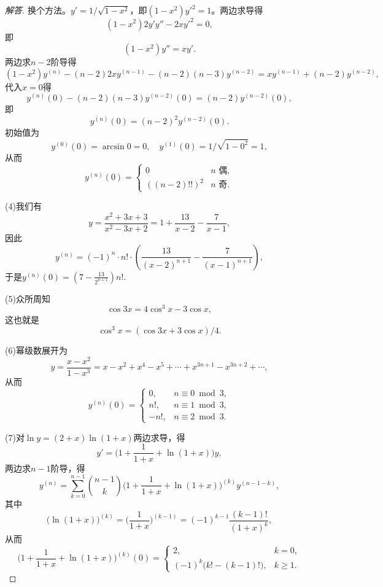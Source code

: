 \begin{3a}
\begin{enumerate}
\begin{proof}[解答]
换个方法。\(y'=1\big/\sqrt{1-x^2}\)，即\((1-x^2)y'^2=1\)。两边求导得
\[(1-x^2)2y'y''-2xy'^2=0,\]
即\[(1-x^2)y''=xy'.\]
两边求\(n-2\)阶导得
\[(1-x^2)y^{(n)}-(n-2)2xy^{(n-1)}-(n-2)(n-3)y^{(n-2)}
=xy^{(n-1)}+(n-2)y^{(n-2)},\]
代入\(x=0\)得
\[y^{(n)}(0)-(n-2)(n-3)y^{(n-2)}(0)=(n-2)y^{(n-2)}(0),\]
即\[y^{(n)}(0)=(n-2)^2y^{(n-2)}(0).\]
初始值为
\[y^{(0)}(0)=\arcsin0=0,\quad y^{(1)}(0)=1/\sqrt{1-0^2}=1,\]
从而\[y^{(n)}(0)=\begin{cases}0&n\text{ 偶},\\((n-2)!!)^2&n\text{ 奇}.\end{cases}\]

(4)我们有\[y=\frac{x^2+3x+3}{x^2-3x+2}=1+\frac{13}{x-2}-\frac{7}{x-1},\]
因此\[y^{(n)}=(-1)^n\cdot n! \cdot\left(\frac{13}{(x-2)^{n+1}}-\frac{7}{(x-1)^{n+1}}\right),\]
于是\(y^{(n)}(0)=\left(7-\frac{13}{2^{n+1}}\right)n!\).

(5)众所周知\[\cos 3x=4\cos^3 x-3\cos x,\]
这也就是\[\cos^3 x=(\cos 3x+3\cos x)/4.\]

(6)幂级数展开为
\[y=\frac{x-x^2}{1-x^3}=x-x^2+x^4-x^5+\cdots+x^{3n+1}-x^{3n+2}+\cdots,\]
从而
\[y^{(n)}(0)=\begin{cases}0,&n\equiv0\bmod3,
\\n!,&n\equiv1\bmod3,\\-n!,&n\equiv2\bmod3.\end{cases}\]

(7)对$\ln y=(2+x)\ln(1+x)$两边求导，得
\[y'=\bigg(1+\frac{1}{1+x}+\ln(1+x)\bigg)y,\]
两边求$n-1$阶导，得
\[y^{(n)}=\sum_{k=0}^{n-1}\binom{n-1}{k}\bigg(1+\frac{1}{1+x}+\ln(1+x)\bigg)^{(k)}y^{(n-1-k)},\]
其中\[\big(\ln(1+x)\big)^{(k)}=\bigg(\frac{1}{1+x}\bigg)^{(k-1)}=(-1)^{k-1}\frac{(k-1)!}{(1+x)^k},\]
从而\[\bigg(1+\frac{1}{1+x}+\ln(1+x)\bigg)^{(k)}(0)
=\begin{cases}2,&k=0,\\(-1)^k\big(k!-(k-1)!\big),&k\geqslant1.\end{cases}\]


\end{proof}
\end{enumerate}
\end{3a}
